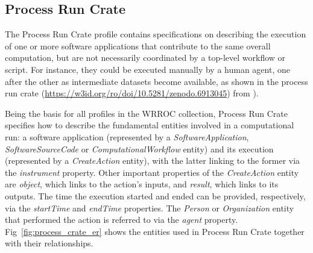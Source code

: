 \documentclass[10pt,letterpaper]{article}
\begin{document}
\subsection{Process Run Crate}\label{process-run-crate}

The Process Run Crate profile \cite{WRROC 2023a} contains specifications on describing the execution of one or more software applications that contribute to the same overall computation, but are not necessarily coordinated by a top-level workflow or script.
For instance, they could be executed manually by a human agent, one after the other as intermediate datasets become available, as shown in the process run crate (\url{https://w3id.org/ro/doi/10.5281/zenodo.6913045}) from \cite{Meurisse 2023}).

Being the basis for all profiles in the WRROC collection, Process Run Crate specifies how to describe the fundamental entities involved in a computational run: a software application (represented by a
\emph{SoftwareApplication}, \emph{SoftwareSourceCode} or
\emph{ComputationalWorkflow} entity) and its execution (represented by a \emph{CreateAction} entity), with the latter linking to the former via the \emph{instrument} property.
Other important properties of the
\emph{CreateAction} entity are \emph{object}, which links to the action's inputs, and \emph{result}, which links to its outputs.
The time the execution started and ended can be provided, respectively, via the
\emph{startTime} and \emph{endTime} properties.
The \emph{Person} or
\emph{Organization} entity that performed the action is referred to via the \emph{agent} property.
Fig~\ref{fig:process_crate_er} shows the entities used in Process Run Crate together with their relationships.
\end{document}
